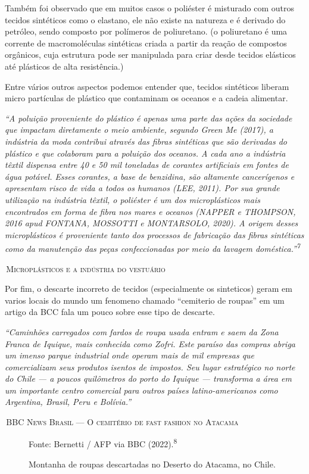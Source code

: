 \documentclass[12pt, a4paper]{article}
\newenvironment{citacaoBox}{%
  \par\vspace{6pt}%
  \def\FrameCommand{{\color{oliveSoft}\vrule width 2pt}\hspace{12pt}}%
  \MakeFramed{\advance\hsize-\width\FrameRestore}%
  \small\itshape\color{ink}%
}{%
  \par\endMakeFramed\vspace{6pt}%
}
\newcommand{\citacaoDestaque}[2]{%
  \begin{citacaoBox}#1\par\vspace{4pt}%
    {\normalfont\footnotesize\color{slate}\hfill\textsc{\textemdash{}\,#2}}%
  \end{citacaoBox}%
}
\begin{document}
Também foi observado que em muitos casos o poliéster é misturado com outros tecidos sintéticos como o elastano, ele não existe na natureza e é derivado do petróleo, sendo composto por polímeros de poliuretano. (o poliuretano é uma corrente de macromoléculas sintéticas criada a partir da reação de compostos orgânicos, cuja estrutura pode ser manipulada para criar desde tecidos elásticos até plásticos de alta resistência.)

Entre vários outros aspectos podemos entender que, tecidos sintéticos liberam micro partículas de plástico que contaminam os oceanos e a cadeia alimentar.

\citacaoDestaque{``A poluição proveniente do plástico é apenas uma parte das ações da sociedade que impactam diretamente o meio ambiente, segundo Green Me (2017), a indústria da moda contribui através das fibras sintéticas que são derivadas do plástico e que colaboram para a poluição dos oceanos. A cada ano a indústria têxtil dispensa entre 40 e 50 mil toneladas de corantes artificiais em fontes de água potável. Esses corantes, a base de benzidina, são altamente cancerígenos e apresentam risco de vida a todos os humanos (LEE, 2011). Por sua grande utilização na indústria têxtil, o poliéster é um dos microplásticos mais encontrados em forma de fibra nos mares e oceanos (NAPPER e THOMPSON, 2016 apud FONTANA, MOSSOTTI e MONTARSOLO, 2020). A origem desses microplásticos é proveniente tanto dos processos de fabricação das fibras sintéticas como da manutenção das peças confeccionadas por meio da lavagem doméstica.''\textsuperscript{7}}{Microplásticos e a indústria do vestuário}

Por fim, o descarte incorreto de tecidos (especialmente os sinteticos) geram em varios locais do mundo um fenomeno chamado ``cemiterio de roupas'' em um artigo da BCC fala um pouco sobre esse tipo de descarte.

\citacaoDestaque{``Caminhões carregados com fardos de roupa usada entram e saem da Zona Franca de Iquique, mais conhecida como Zofri. Este paraíso das compras abriga um imenso parque industrial onde operam mais de mil empresas que comercializam seus produtos isentos de impostos. Seu lugar estratégico no norte do Chile --- a poucos quilômetros do porto do Iquique --- transforma a área em um importante centro comercial para outros países latino-americanos como Argentina, Brasil, Peru e Bolívia.''}{BBC News Brasil --- O cemitério de fast fashion no Atacama}

\begin{figure}[H]
\centering
\setlength{\fboxsep}{0pt}%
\caption{Montanha de roupas descartadas no Deserto do Atacama, no Chile.}\label{fig:atacama}
{\footnotesize\color{slate}Fonte: Bernetti / AFP via BBC (2022).\textsuperscript{8}}
\end{figure}
\end{document}
